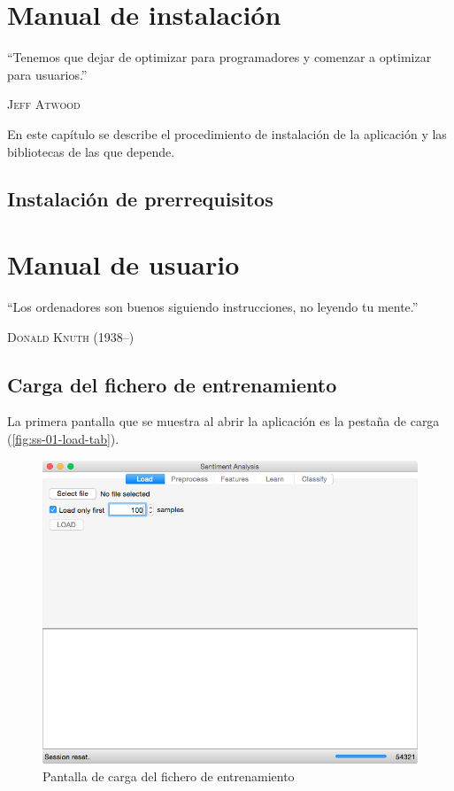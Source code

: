 
\chapter{Manual de instalación}
     
\epigraph{``Tenemos que dejar de optimizar para programadores y comenzar a optimizar para usuarios.''}{\textsc{Jeff Atwood}}

En este capítulo se describe el procedimiento de instalación de la aplicación y las bibliotecas de las que depende.

\section{Instalación de prerrequisitos}



\chapter{Manual de usuario}

\epigraph{``Los ordenadores son buenos siguiendo instrucciones, no leyendo tu mente.''}{\textsc{Donald Knuth} (1938--)}

\section{Carga del fichero de entrenamiento}

La primera pantalla que se muestra al abrir la aplicación es la pestaña de carga (\autoref{fig:ss-01-load-tab}).

\begin{figure}[H]
\centering
\includegraphics[width=12cm]{ss-01-load-tab}
\caption{Pantalla de carga del fichero de entrenamiento}
\label{fig:ss-01-load-tab}
\end{figure}


